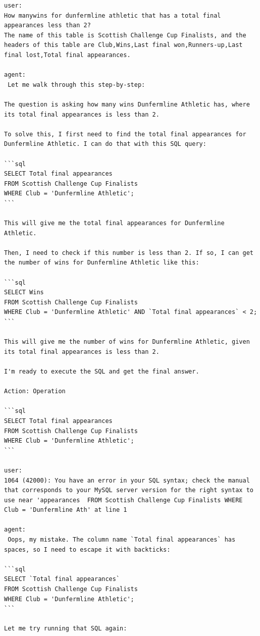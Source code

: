 \begin{lstlisting}
user:
How manywins for dunfermline athletic that has a total final appearances less than 2?
The name of this table is Scottish Challenge Cup Finalists, and the headers of this table are Club,Wins,Last final won,Runners-up,Last final lost,Total final appearances.

agent:
 Let me walk through this step-by-step:

The question is asking how many wins Dunfermline Athletic has, where its total final appearances is less than 2. 

To solve this, I first need to find the total final appearances for Dunfermline Athletic. I can do that with this SQL query:

```sql
SELECT Total final appearances 
FROM Scottish Challenge Cup Finalists
WHERE Club = 'Dunfermline Athletic';
```

This will give me the total final appearances for Dunfermline Athletic. 

Then, I need to check if this number is less than 2. If so, I can get the number of wins for Dunfermline Athletic like this:

```sql
SELECT Wins
FROM Scottish Challenge Cup Finalists 
WHERE Club = 'Dunfermline Athletic' AND `Total final appearances` < 2;
```

This will give me the number of wins for Dunfermline Athletic, given its total final appearances is less than 2.

I'm ready to execute the SQL and get the final answer.

Action: Operation

```sql
SELECT Total final appearances 
FROM Scottish Challenge Cup Finalists
WHERE Club = 'Dunfermline Athletic';
```

user:
1064 (42000): You have an error in your SQL syntax; check the manual that corresponds to your MySQL server version for the right syntax to use near 'appearances  FROM Scottish Challenge Cup Finalists WHERE Club = 'Dunfermline Ath' at line 1

agent:
 Oops, my mistake. The column name `Total final appearances` has spaces, so I need to escape it with backticks:

```sql
SELECT `Total final appearances`
FROM Scottish Challenge Cup Finalists
WHERE Club = 'Dunfermline Athletic';
```

Let me try running that SQL again:


\end{lstlisting}
